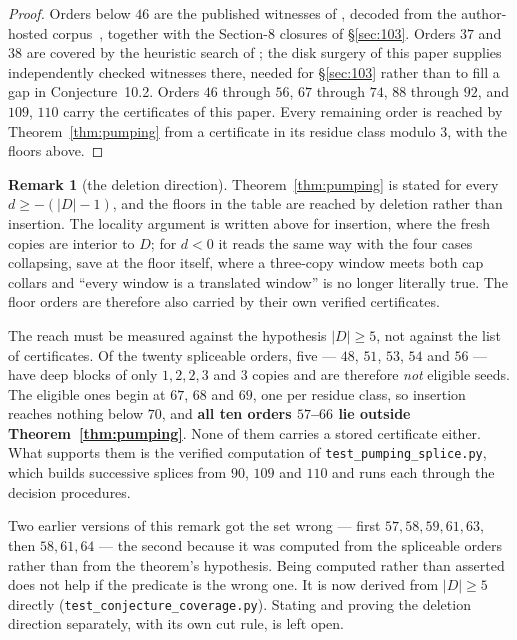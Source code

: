 \documentclass[11pt,a4paper]{amsart}
\theoremstyle{plain}
\theoremstyle{definition}
\newtheorem{remark}[theorem]{Remark}
\begin{document}
\begin{proof}
Orders below $46$ are the published witnesses of \cite{AHSSV2015}, decoded from
the author-hosted corpus~\cite{APGcorpus}, together with the Section-8 closures
of \S\ref{sec:103}. Orders $37$ and $38$ are covered by the heuristic search of
\cite{AHSSV2015}; the disk surgery of this paper supplies independently checked
witnesses there, needed for \S\ref{sec:103} rather than to fill a gap in
Conjecture~10.2. Orders $46$ through $56$, $67$
through $74$, $88$ through $92$, and $109$, $110$ carry the certificates of this
paper. Every remaining order is reached by Theorem~\ref{thm:pumping} from a
certificate in its residue class modulo $3$, with the floors above.
\end{proof}

\begin{remark}[the deletion direction]\label{rem:deletion}
Theorem~\ref{thm:pumping} is stated for every $d \ge -(|D|-1)$, and the floors
in the table are reached by deletion rather than insertion. The locality
argument is written above for insertion, where the fresh copies are interior to
$D$; for $d < 0$ it reads the same way with the four cases collapsing, save at
the floor itself, where a three-copy window meets both cap collars and ``every
window is a translated window'' is no longer literally true. The floor orders are therefore also carried by their own
verified certificates.

The reach must be measured against the hypothesis $|D| \ge 5$, not against the
list of certificates. Of the twenty spliceable orders, five --- $48$, $51$, $53$,
$54$ and $56$ --- have deep blocks of only $1, 2, 2, 3$ and $3$ copies and are
therefore \emph{not} eligible seeds. The eligible ones begin at $67$, $68$ and
$69$, one per residue class, so insertion reaches nothing below $70$, and
\textbf{all ten orders $57$--$66$ lie outside Theorem~\ref{thm:pumping}}. None
of them carries a stored certificate either. What supports them is the verified
computation of \texttt{test\_pumping\_splice.py}, which builds successive
splices from $90$, $109$ and $110$ and runs each through the decision
procedures.

Two earlier versions of this remark got the set wrong --- first $57,58,59,61,63$,
then $58,61,64$ --- the second because it was computed from the spliceable
orders rather than from the theorem's hypothesis. Being computed rather than
asserted does not help if the predicate is the wrong one. It is now derived from
$|D| \ge 5$ directly (\texttt{test\_conjecture\_coverage.py}). Stating and
proving the deletion direction separately, with its own cut rule, is left open.
\end{remark}
\end{document}
